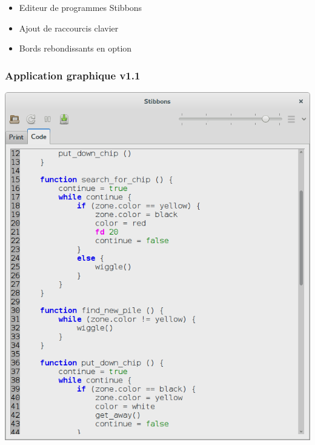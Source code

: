 \begin{frame}
\begin{itemize}
	\item Editeur de programmes Stibbons
	\item Ajout de raccourcis clavier
	\item Bords rebondissants en option
\end{itemize}
\end{frame}

\begin{frame}
\frametitle{Application graphique v1.1}
\begin{center}
\includegraphics[scale=0.16]{doc/Presentation/screenshot/stibbons-0-5-2.png}
~~~~~~~~

\end{center}
\end{frame}
